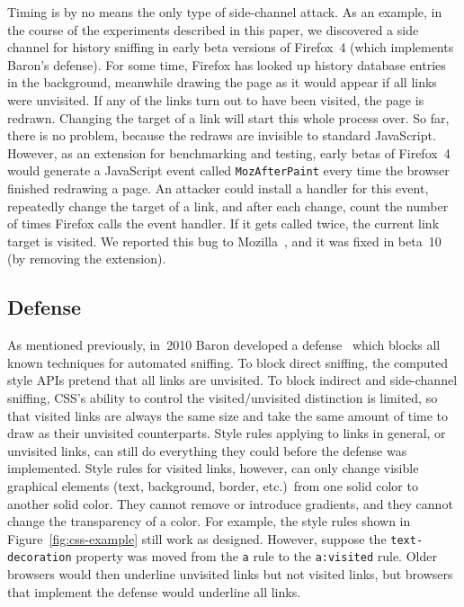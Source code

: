 \documentclass[conference]{IEEEtran}
\begin{document}
Timing is by no means the only type of side-channel attack.  As an
example, in the course of the experiments described in this paper, we
discovered a side channel for history sniffing in early beta versions
of Firefox~4 (which implements Baron's defense).  For some time,
Firefox has looked up history database entries in the background,
meanwhile drawing the page as it would appear if all links were
unvisited.  If any of the links turn out to have been visited, the
page is redrawn.  Changing the target of a link will start this whole
process over.  So far, there is no problem, because the redraws are
invisible to standard JavaScript.  However, as an extension for
benchmarking and testing, early betas of Firefox~4 would generate a
JavaScript event called \texttt{MozAfterPaint} every time the browser
finished redrawing a page.  An attacker could install a handler for
this event, repeatedly change the target of a link, and after each
change, count the number of times Firefox calls the event handler.  If
it gets called twice, the current link target is visited.  We reported
this bug to Mozilla~\cite{moz_repaint_bug}, and it was fixed in
beta~10 (by removing the extension).

\subsection{Defense}\label{sec:defense}

As mentioned previously, in~2010 Baron developed a
defense~\cite{moz_visited_defense} which blocks all known techniques
for automated sniffing.  To block direct sniffing, the computed style
APIs pretend that all links are unvisited.  To block indirect and
side-channel sniffing, CSS's ability to control the visited/unvisited
distinction is limited, so that visited links are always the same size
and take the same amount of time to draw as their unvisited
counterparts.  Style rules applying to links in general, or unvisited
links, can still do everything they could before the defense was
implemented.  Style rules for visited links, however, can only change
visible graphical elements (text, background, border, etc.)\ from one
solid color to another solid color.  They cannot remove or introduce
gradients, and they cannot change the transparency of a color.  For
example, the style rules shown in Figure~\ref{fig:css-example} still work
as designed.  However, suppose the \texttt{text-decoration} property
was moved from the \texttt{a} rule to the \texttt{a:visited} rule.
Older browsers would then underline unvisited links but not visited
links, but browsers that implement the defense would underline all
links.
\end{document}

